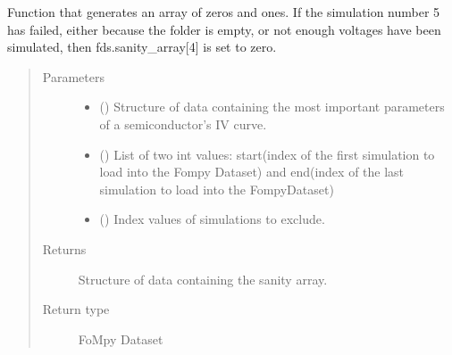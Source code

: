 \documentclass[letterpaper,10pt,english,openany, oneside]{sphinxmanual}
\begin{document}

\begin{fulllineitems}
\label{\detokenize{index:fompy.fds.exclude_indexes}}
Function that generates an array of zeros and ones. If the simulation
number 5 has failed, either because the folder is empty, or not enough voltages
have been simulated, then fds.sanity\_array{[}4{]} is set to zero.
\begin{quote}\begin{description}
\item[{Parameters}] \leavevmode\begin{itemize}
\item {} 
 () \textendash{} Structure of data containing the most important parameters of a semiconductor’s IV curve.

\item {} 
 () \textendash{} List of two int values: start(index of the first simulation to load into the Fompy Dataset)
and end(index of the last simulation to load into the FompyDataset)

\item {} 
 () \textendash{} Index values of simulations to exclude.

\end{itemize}

\item[{Returns}] \leavevmode
{} \textendash{} Structure of data containing the sanity array.

\item[{Return type}] \leavevmode
FoMpy Dataset

\end{description}\end{quote}

\end{fulllineitems}

\end{document}
